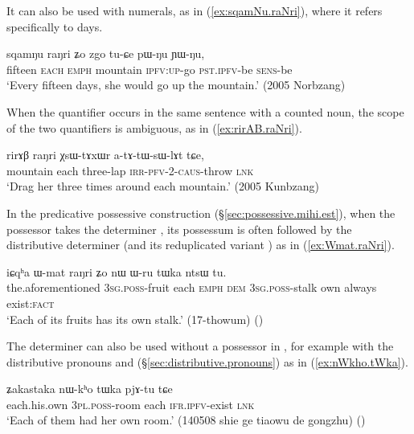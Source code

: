  It can also be used with numerals, as in (\ref{ex:sqamNu.raNri}), where it refers specifically to days.

 \begin{exe}
\ex \label{ex:sqamNu.raNri}
\gll  sqamŋu raŋri ʑo zgo tu-ɕe pɯ-ŋu ɲɯ-ŋu, \\
fifteen \textsc{each} \textsc{emph} mountain \textsc{ipfv}:\textsc{up}-go \textsc{pst}.\textsc{ipfv}-be \textsc{sens}-be \\
\glt `Every fifteen days, she would go up the mountain.' (2005 Norbzang)
  \end{exe}

When the quantifier  occurs in the same sentence with a counted noun, the scope of the two quantifiers is ambiguous, as in (\ref{ex:rirAB.raNri}).

\begin{exe}
\ex \label{ex:rirAB.raNri}
\gll rirɤβ raŋri χsɯ-tɤxɯr a-tɤ-tɯ-sɯ-lɤt tɕe, \\
mountain each three-lap \textsc{irr}-\textsc{pfv}-2-\textsc{caus}-throw \textsc{lnk} \\
\glt `Drag her three times around each mountain.' (2005 Kunbzang)
 \end{exe}
 
In the predicative possessive construction (§\ref{sec:possessive.mihi.est}), when the possessor takes the determiner , its possessum is often  followed by the distributive determiner  (and its reduplicated variant ) as in (\ref{ex:Wmat.raNri}).
 
  \begin{exe}
\ex \label{ex:Wmat.raNri}
\gll   iɕqʰa ɯ-mat raŋri ʑo nɯ ɯ-ru tɯka ntsɯ tu. \\
the.aforementioned \textsc{3sg}.\textsc{poss}-fruit each \textsc{emph} \textsc{dem} \textsc{3sg}.\textsc{poss}-stalk own always exist:\textsc{fact} \\
\glt `Each of its fruits has its own stalk.' (17-thowum)
()
  \end{exe}
  
The  determiner  can also be used without a possessor in , for example with the distributive pronouns  and  (§\ref{sec:distributive.pronouns})  as in (\ref{ex:nWkho.tWka}).

   \begin{exe}
\ex \label{ex:nWkho.tWka}
\gll   ʑakastaka nɯ-kʰo tɯka pjɤ-tu tɕe \\
each.his.own \textsc{3pl}.\textsc{poss}-room each \textsc{ifr}.\textsc{ipfv}-exist \textsc{lnk} \\
\glt `Each of them had her own room.' (140508 shie ge tiaowu de gongzhu)
()
   \end{exe}
   
